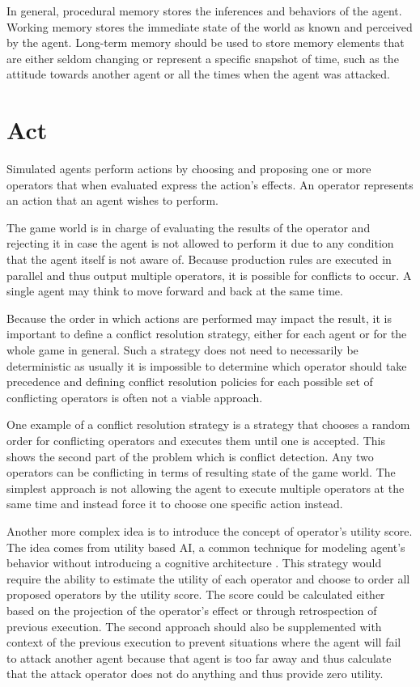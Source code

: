 In general, procedural memory stores the inferences and behaviors of the agent.
Working memory stores the immediate state of the world as known and perceived by the agent.
Long-term memory should be used to store memory elements that are either seldom changing or represent a specific snapshot of time, such as the attitude towards another agent or all the times when the agent was attacked.

\section{Act}

Simulated agents perform actions by choosing and proposing one or more operators that when evaluated express the action's effects.
An operator represents an action that an agent wishes to perform.

The game world is in charge of evaluating the results of the operator and rejecting it in case the agent is not allowed to perform it due to any condition that the agent itself is not aware of.
Because production rules are executed in parallel and thus output multiple operators, it is possible for conflicts to occur.
A single agent may think to move forward and back at the same time.

Because the order in which actions are performed may impact the result, it is important to define a conflict resolution strategy, either for each agent or for the whole game in general.
Such a strategy does not need to necessarily be deterministic as usually it is impossible to determine which operator should take precedence and defining conflict resolution policies for each possible set of conflicting operators is often not a viable approach.

One example of a conflict resolution strategy is a strategy that chooses a random order for conflicting operators and executes them until one is accepted.
This shows the second part of the problem which is conflict detection.
Any two operators can be conflicting in terms of resulting state of the game world.
The simplest approach is not allowing the agent to execute multiple operators at the same time and instead force it to choose one specific action instead.

Another more complex idea is to introduce the concept of operator's utility score.
The idea comes from utility based AI, a common technique for modeling agent's behavior without introducing a cognitive architecture \cite{dill2012design}.
This strategy would require the ability to estimate the utility of each operator and choose to order all proposed operators by the utility score.
The score could be calculated either based on the projection of the operator's effect or through retrospection of previous execution.
The second approach should also be supplemented with context of the previous execution to prevent situations where the agent will fail to attack another agent because that agent is too far away and thus calculate that the attack operator does not do anything and thus provide zero utility.

